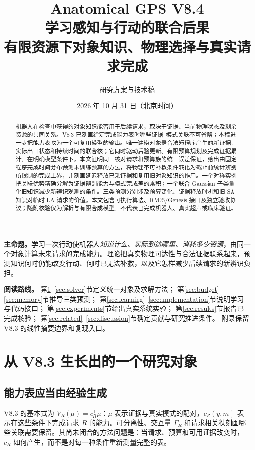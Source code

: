 \documentclass[11pt,a4paper,fontset=fandol]{ctexart}
\title{\color{ink}\bfseries Anatomical GPS V8.4\\[0.35em]\LARGE 学习感知与行动的联合后果\\[0.25em]\large 有限资源下对象知识、物理选择与真实请求完成}
\author{研究方案与技术稿}
\date{2026 年 10 月 31 日（北京时间）}
\theoremstyle{definition}
\theoremstyle{remark}
\numberwithin{equation}{section}
\begin{document}
\maketitle
\begin{abstract}
机器人在检查中获得的对象知识能否用于后续请求，取决于证据、当前物理状态及剩余资源的共同关系。V8.3 已刻画给定完成能力表时哪些证据--模式关联不可省略；本稿进一步把能力表改为一个可复用模型的输出。唯一建模对象是合法短程序产生的新证据、实际出口状态和持续时间的联合核；它同时驱动后验更新、有限预算规划及完成证据累计。在明确模型条件下，本文证明同一核对请求和预算族的统一误差保证，给出由固定程序完成时间分布预测未训练预算的方法，将物理不可补救条件转化为截止前统计辨别所限制的完成上界，并刻画延迟释放已采证据和复用旧对象知识的作用。一个对称实例把关联优势精确分解为证据辨别能力与模式完成差的乘积；一个联合 Gaussian 子类量化旧知识减少新辨识观测的条件。三类预测分别涉及预算变化、证据释放时机和旧 SA 知识对临时 LA 请求的价值。本文包含可执行算法、RM75/Genesis 接口及独立验收协议；随附核验仅为解析与有限合成模型，不代表已完成机器人、真实超声或临床验证。
\end{abstract}
\begin{corebox}
\textbf{主命题。}学习一次行动使机器人\emph{知道什么、实际到达哪里、消耗多少资源}，由同一个对象计算未来请求的完成能力。理论把真实物理可达性与合法证据联系起来，预测知识何时仍能改变行动、何时已无法补救，以及它怎样减少后续请求的新辨识负担。
\end{corebox}
\clearpage
\tableofcontents
\vspace{1.5em}
\begin{corebox}
\textbf{阅读路线。}
第\ref{sec:intro}--\ref{sec:solver}节定义统一对象及求解方法；
第\ref{sec:budget}--\ref{sec:memory}节推导三类预测；
第\ref{sec:learning}--\ref{sec:implementation}节说明学习与代码接口；
第\ref{sec:experiments}节给出真实系统实验；
第\ref{sec:results}节报告已完成核验；
第\ref{sec:related}--\ref{sec:discussion}节确定贡献与研究推进条件。
附录保留 V8.3 的线性摘要边界和复现入口。
\end{corebox}
\newpage

\section{从 V8.3 生长出的一个研究对象}
\label{sec:intro}
\subsection{能力表应当由经验生成}
V8.3 的基本式为 $V_R(\mu)=c_R^\top\mu$：$\mu$ 表示证据与真实模式的配对，$c_R(y,m)$ 表示在这些条件下完成请求 $R$ 的能力。可分离性、交互量 $\Gamma_R$ 和请求相关秩刻画哪些关联需要保留\cite{v83}。其尚未闭合的方法问题是：当请求、预算和可用证据改变时，$c_R$ 如何产生，而不是对每一种条件重新测量完整的表。
\end{document}
